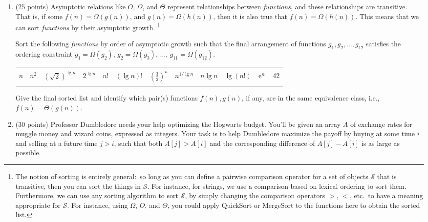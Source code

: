 \documentclass[12pt]{article}
\begin{document}
\begin{enumerate}
	\item (25 points) Asymptotic relations like $O$, $\Omega$, and $\Theta$ represent 
	relationships between \textit{functions}, and these relationships are transitive. 
	That is, if some $f(n)=\Omega(g(n))$, and $g(n)=\Omega(h(n))$, then it is also true 
	that $f(n)=\Omega(h(n))$. This means that we can sort \textit{functions} by their asymptotic growth.%
	\footnote{The notion of sorting is entirely general:\ so long as you can define a pairwise comparison operator for a set of 
	objects $\mathcal{S}$ that is transitive, then you can sort the things in $\mathcal{S}$. For instance, for strings, we use a 
	comparison based on lexical ordering to sort them. Furthermore, we can use any sorting algorithm to sort $\mathcal{S}$, by 
	simply changing the comparison operators $>$, $<$, etc.\ to have a meaning appropriate for $\mathcal{S}$. 
	For instance, using $\Omega$, $O$, and $\Theta$, you could apply QuickSort or MergeSort to the functions here to obtain the 
	sorted list.}
    
    Sort the following {\em functions} by order of asymptotic growth such that the final arrangement of functions $g_{1},g_{2},\dots,g_{12}$ satisfies the ordering constraint $g_{1}=\Omega(g_{2})$, $g_{2}=\Omega(g_{3})$, $\dots$, $g_{11}=\Omega(g_{12})$.
    
    \begin{center}
    	\begin{tabular}{|c|c|c|c|c|c|c|c|c|c|c|c|} %
    		\hline
    		& & & & & & & & & & & \\
    		$n$ & $n^{2}$  & $(\sqrt{2})^{\lg n}$ & $2^{\lg n}$ & $n!$ & $(\lg n)!$ & $\left(\frac{3}{2}\right)^{n}$ & $n^{1/\lg n}$ & $n \lg n$ & $\lg(n!)$ & ${\rm e}^{n}$ & 42 \\
    		& & & & & & & & & & & \\
    		\hline
    	\end{tabular}
    \end{center}
    
    Give the final sorted list and identify which pair(s) functions $f(n),g(n)$, if any, are in the same equivalence class, i.e., $f(n)=\Theta(g(n))$.

    \pagebreak

	
	\item (30 points) Professor Dumbledore needs your help optimizing the Hogwarts budget. You'll be given an array $A$ of exchange rates for muggle money and wizard coins, expressed as integers. Your task is to help Dumbledore maximize the payoff by buying at some time $i$ and selling at a future time $j > i$, such that both $A[j] > A[i]$ and the corresponding difference of $A[j]-A[i]$ is as large as possible.
	

\end{enumerate}
\end{document}
